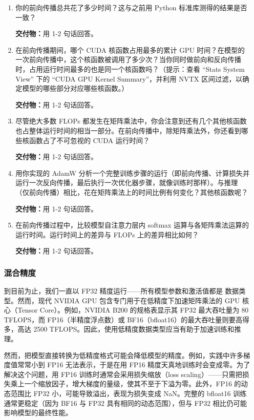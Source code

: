 \begin{enumerate}[label=(\alph*)]
  \item 你的前向传播总共花了多少时间？这与之前用 Python 标准库测得的结果是否一致？

  \textbf{交付物：}用 1-2 句话回答。

  \item 在前向传播期间，哪个 CUDA 核函数占用最多的累计 GPU 时间？在模型的一次前向传播中，这个核函数被调用了多少次？当你同时做前向和反向传播时，占用运行时间最多的也是同一个核函数吗？（提示：查看 “Stats System View” 下的 “CUDA GPU Kernel Summary”，并利用 NVTX 区间过滤，以确定模型的哪些部分对应哪些核函数。）

  \textbf{交付物：}用 1-2 句话回答。

  \item 尽管绝大多数 FLOPs 都发生在矩阵乘法中，你会注意到还有几个其他核函数也占整体运行时间的相当一部分。在前向传播中，除矩阵乘法外，你还看到哪些核函数占了不可忽视的 CUDA 运行时间？

  \textbf{交付物：}用 1-2 句话回答。

  \item 用你实现的 AdamW 分析一个完整训练步骤的运行（即前向传播、计算损失并运行一次反向传播，最后执行一次优化器步骤，就像训练时那样）。与推理（仅前向传播）相比，花在矩阵乘法上的时间比例有何变化？其他核函数呢？

  \textbf{交付物：}用 1-2 句话回答。

  \item 在前向传播过程中，比较模型自注意力层内 softmax 运算与各矩阵乘法运算的运行时间。运行时间上的差异与 FLOPs 上的差异相比如何？

  \textbf{交付物：}用 1-2 句话回答。
\end{enumerate}

\subsubsection{混合精度}

到目前为止，我们一直以 FP32 精度运行——所有模型参数和激活值都是  数据类型。然而，现代 NVIDIA GPU 包含专门用于在低精度下加速矩阵乘法的 GPU 核心（Tensor Core）。例如，NVIDIA B200 的规格表显示其 FP32 最大吞吐量为 80 TFLOPS，而 FP16（半精度浮点数）或 BF16（bfloat16）的最大吞吐量则要高得多，高达 2500 TFLOPS。因此，使用低精度数据类型应当有助于加速训练和推理。

然而，把模型直接转换为低精度格式可能会降低模型的精度。例如，实践中许多梯度值常常小到 FP16 无法表示，于是在用 FP16 精度天真地训练时会变成零。为了解决这个问题，用 FP16 训练时通常会采用损失缩放（loss scaling）——只需把损失乘上一个缩放因子，增大梯度的量级，使其不至于下溢为零。此外，FP16 的动态范围比 FP32 小，可能导致溢出，表现为损失变成 NaN。完整的 bfloat16 训练通常更稳定（因为 BF16 与 FP32 具有相同的动态范围），但与 FP32 相比仍可能影响模型的最终性能。

